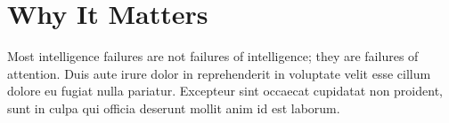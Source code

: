 \documentclass[11pt]{article}
\begin{document}
\section{Why It Matters}
Most intelligence failures are not failures of intelligence; they are failures of attention. Duis aute irure dolor in reprehenderit in voluptate velit esse cillum dolore eu fugiat nulla pariatur. Excepteur sint occaecat cupidatat non proident, sunt in culpa qui officia deserunt mollit anim id est laborum.
\end{document}
